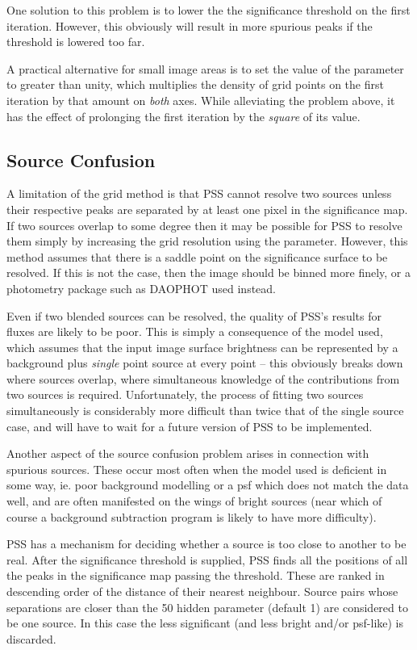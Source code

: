 One solution to this problem is to lower the the significance threshold on
the first iteration. However, this obviously will result in more spurious
peaks if the threshold is lowered too far.

A practical alternative for small image areas is to set the value of the
 parameter to greater than unity, which multiplies the
density of grid points on the first iteration by that amount on {\em both}
axes. While alleviating the problem above, it has the effect of prolonging
the first iteration by the {\em square} of its value.

\subsection{Source Confusion}

A limitation of the grid method is that PSS cannot resolve
two sources unless their respective peaks are separated by at least one
pixel in the significance map. If two sources overlap to some degree
then it may be possible for PSS to resolve them simply by increasing
the grid resolution using the  parameter. However, this
method assumes that there is a saddle point on the significance 
surface to be resolved. If this is not the case, then the image should
be binned more finely, or a photometry package such as DAOPHOT used instead.

Even if two blended sources can be resolved, the quality of PSS's results
for fluxes are likely to be poor. This is simply a consequence of the
model used, which assumes that the input image surface brightness can
be represented by a background plus {\em single} point source at every
point -- this obviously breaks down where sources overlap, where
simultaneous knowledge of the contributions from two sources is required.
Unfortunately, the process of fitting two sources simultaneously is
considerably more difficult than twice that of the single source case,
and will have to wait for a future version of PSS to be implemented.

Another aspect of the source confusion problem arises in connection with
spurious sources. These occur
most often when the model used is deficient in some way, ie. poor
background modelling or a psf which does not match the data well, and
are often manifested on the wings of bright sources (near which of
course a background subtraction program is likely to have more difficulty).

PSS has a mechanism for deciding whether a source is too close to
another to be real. After the significance threshold is supplied,
PSS finds all the positions of all the peaks in the significance
map passing the threshold. These are ranked in descending order of 
the distance of their nearest neighbour. Source pairs whose separations
are closer than 
the 50%
hidden  parameter (default 1) are considered to be one
source. In this case the less significant (and less bright and/or psf-like) is
discarded. 


